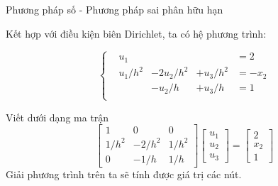 \documentclass[aspectratio=169, t]{beamer} %
\begin{document}
\begin{frame}{Phương pháp số - Phương pháp sai phân hữu hạn}

Kết hợp với điều kiện biên Dirichlet, ta có hệ phương trình:

\begin{equation}
    \left\{\begin{matrix}
        &u_1 & & &=2 \\
        &u_1/h^2 &-2u_2/h^2 &+ u_3/h^2 &=-x_2 \\
        & &-u_2/h &+ u_3/h &= 1\\
    \end{matrix}\right.
\end{equation}

Viết dưới dạng ma trận
\begin{equation}
    \begin{bmatrix}
        1 & 0 & 0 \\ 1/h^2 & -2/h^2 & 1/h^2 \\ 0 & -1/h & 1/h 
    \end{bmatrix}\begin{bmatrix}
        u_1 \\ u_2 \\ u_3 
    \end{bmatrix} = \begin{bmatrix}
        2 \\ x_2 \\ 1
    \end{bmatrix}
\end{equation}
Giải phương trình trên ta sẽ tính được giá trị các nút.
\end{frame}
\end{document}
